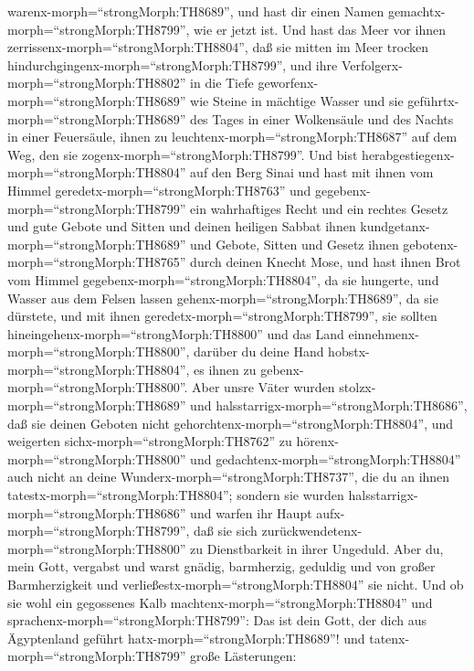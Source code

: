 warenx-morph=``strongMorph:TH8689'', und hast dir einen Namen
gemachtx-morph=``strongMorph:TH8799'', wie er jetzt ist. 
Und hast das Meer vor ihnen zerrissenx-morph=``strongMorph:TH8804'', daß
sie mitten im Meer trocken hindurchgingenx-morph=``strongMorph:TH8799'',
und ihre Verfolgerx-morph=``strongMorph:TH8802'' in die Tiefe
geworfenx-morph=``strongMorph:TH8689'' wie Steine in mächtige Wasser
 und sie geführtx-morph=``strongMorph:TH8689'' des Tages in
einer Wolkensäule und des Nachts in einer Feuersäule, ihnen zu
leuchtenx-morph=``strongMorph:TH8687'' auf dem Weg, den sie
zogenx-morph=``strongMorph:TH8799''.  Und bist
herabgestiegenx-morph=``strongMorph:TH8804'' auf den Berg Sinai und hast
mit ihnen vom Himmel geredetx-morph=``strongMorph:TH8763'' und
gegebenx-morph=``strongMorph:TH8799'' ein wahrhaftiges Recht und ein
rechtes Gesetz und gute Gebote und Sitten  und deinen
heiligen Sabbat ihnen kundgetanx-morph=``strongMorph:TH8689'' und
Gebote, Sitten und Gesetz ihnen gebotenx-morph=``strongMorph:TH8765''
durch deinen Knecht Mose,  und hast ihnen Brot vom Himmel
gegebenx-morph=``strongMorph:TH8804'', da sie hungerte, und Wasser aus
dem Felsen lassen gehenx-morph=``strongMorph:TH8689'', da sie dürstete,
und mit ihnen geredetx-morph=``strongMorph:TH8799'', sie sollten
hineingehenx-morph=``strongMorph:TH8800'' und das Land
einnehmenx-morph=``strongMorph:TH8800'', darüber du deine Hand
hobstx-morph=``strongMorph:TH8804'', es ihnen zu
gebenx-morph=``strongMorph:TH8800''.  Aber unsre Väter
wurden stolzx-morph=``strongMorph:TH8689'' und
halsstarrigx-morph=``strongMorph:TH8686'', daß sie deinen Geboten nicht
gehorchtenx-morph=``strongMorph:TH8804'',  und weigerten
sichx-morph=``strongMorph:TH8762'' zu
hörenx-morph=``strongMorph:TH8800'' und
gedachtenx-morph=``strongMorph:TH8804'' auch nicht an deine
Wunderx-morph=``strongMorph:TH8737'', die du an ihnen
tatestx-morph=``strongMorph:TH8804''; sondern sie wurden
halsstarrigx-morph=``strongMorph:TH8686'' und warfen ihr Haupt
aufx-morph=``strongMorph:TH8799'', daß sie sich
zurückwendetenx-morph=``strongMorph:TH8800'' zu Dienstbarkeit in ihrer
Ungeduld. Aber du, mein Gott, vergabst und warst gnädig, barmherzig,
geduldig und von großer Barmherzigkeit und
verließestx-morph=``strongMorph:TH8804'' sie nicht.  Und ob
sie wohl ein gegossenes Kalb machtenx-morph=``strongMorph:TH8804'' und
sprachenx-morph=``strongMorph:TH8799'': Das ist dein Gott, der dich aus
Ägyptenland geführt hatx-morph=``strongMorph:TH8689''! und
tatenx-morph=``strongMorph:TH8799'' große Lästerungen: 
